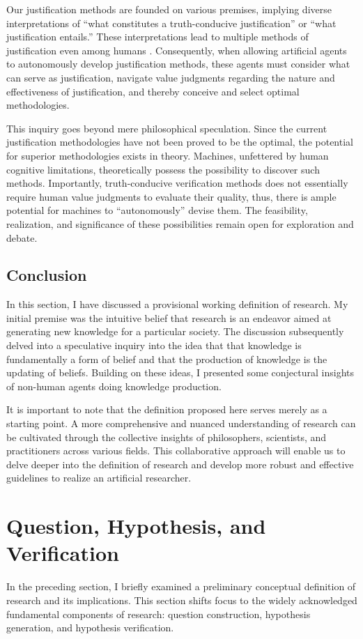 \documentclass{article}
\begin{document}
Our justification methods are founded on various premises, implying diverse interpretations of ``what constitutes a truth-conducive justification'' or ``what justification entails.'' These interpretations lead to multiple methods of justification even among humans \cite{otsuka2022thinking}. Consequently, when allowing artificial agents to autonomously develop justification methods, these agents must consider what can serve as justification, navigate value judgments regarding the nature and effectiveness of justification, and thereby conceive and select optimal methodologies.

This inquiry goes beyond mere philosophical speculation. Since the current justification methodologies have not been proved to be the optimal, the potential for superior methodologies exists in theory. Machines, unfettered by human cognitive limitations, theoretically possess the possibility to discover such methods. Importantly, truth-conducive verification methods does not essentially require human value judgments to evaluate their quality, thus, there is ample potential for machines to ``autonomously'' devise them. The feasibility, realization, and significance of these possibilities remain open for exploration and debate.

\subsection{Conclusion}
In this section, I have discussed a provisional working definition of research. My initial premise was the intuitive belief that research is an endeavor aimed at generating new knowledge for a particular society. The discussion subsequently delved into a speculative inquiry into the idea that that knowledge is fundamentally a form of belief and that the production of knowledge is the updating of beliefs. Building on these ideas, I presented some conjectural insights of non-human agents doing knowledge production.

It is important to note that the definition proposed here serves merely as a starting point. A more comprehensive and nuanced understanding of research can be cultivated through the collective insights of philosophers, scientists, and practitioners across various fields. This collaborative approach will enable us to delve deeper into the definition of research and develop more robust and effective guidelines to realize an artificial researcher.

\section{Question, Hypothesis, and  Verification}
\label{section-question-hypothesis-verification}
In the preceding section, I briefly examined a preliminary conceptual definition of research and its implications. This section shifts focus to the widely acknowledged fundamental components of research: question construction, hypothesis generation, and hypothesis verification. 
\end{document}
